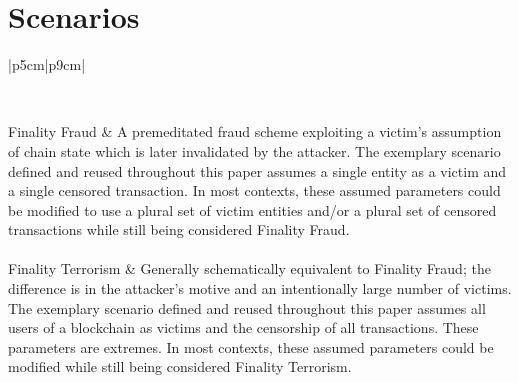 \documentclass[11pt]{article}
\theoremstyle{plain}
\begin{document}

\section{\normalsize{Scenarios}}

\begin{table}[H]
\caption{Outlines of Referenced Chain State Scenarios \label{table: chainstate-scenarios}}
\centering
\small{
\begin{tabular}{|p{5cm}|p{9cm}|}

\hline
{} \\
\hline
\hline

Finality Fraud & A premeditated fraud scheme exploiting a victim's
assumption of chain state which is later invalidated by the attacker.
The exemplary scenario defined and reused throughout this paper assumes a single
entity as a victim and a single censored transaction.
In most contexts, these assumed parameters could be modified to use a plural set of victim entities
and/or a plural set of censored transactions while still being considered Finality Fraud.
\\~\\

Finality Terrorism & Generally schematically equivalent to Finality
Fraud; the difference is in the attacker's motive and an intentionally large number of victims.
The exemplary scenario defined and reused throughout this paper
assumes all users of a blockchain as victims and the censorship of all transactions.
These parameters are extremes.
In most contexts, these assumed parameters could be modified while still being considered Finality Terrorism.
\\~\\

\hline
\end{tabular}
}
\end{table}


\end{document}
